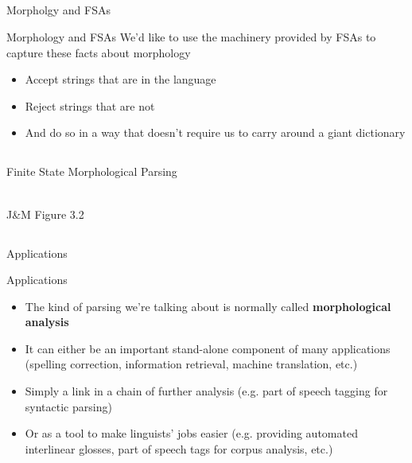 \documentclass[9pt,xcolor=pdftex,dvipsnames,table]{beamer}
\begin{document}
\subsection{}
\begin{frame}{Morpholgy and FSAs}

\begin{block}{Morphology and FSAs}
We'd like to use the machinery provided by
FSAs to capture these facts about
morphology
\end{block}
\vspace{1cm}
\begin{itemize}
	\item Accept strings that are in the language
	\item Reject strings that are not
	\item And do so in a way that doesn't require us to carry around a giant dictionary
\end{itemize}
\end{frame}

\subsection{}
\begin{frame}{Finite State Morphological Parsing}
\begin{center}
	\\
	{\large J\&M Figure 3.2}\\
\end{center}
\end{frame}

\subsection{}
\begin{frame}{Applications}

{\large Applications }

\begin{itemize}
	\item The kind of parsing we're talking about is normally called \textbf{morphological analysis}
	\item It can either be an important stand-alone component of many applications (spelling correction, information retrieval, machine translation, etc.)
	\item Simply a link in a chain of further analysis (e.g. part of speech tagging for syntactic parsing)
	\item Or as a tool to make linguists' jobs easier (e.g. providing automated interlinear glosses, part of speech tags for corpus analysis, etc.)
\end{itemize}
\end{frame}
\end{document}
